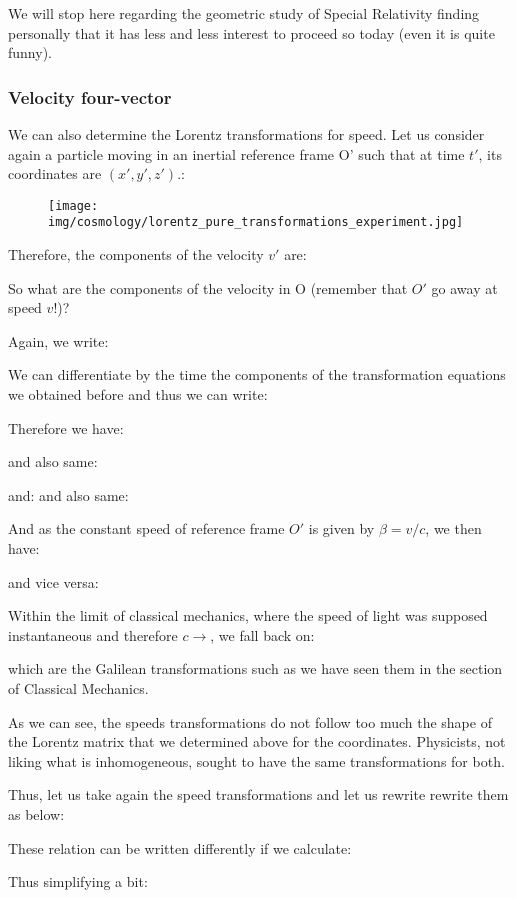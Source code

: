 	We will stop here regarding the geometric study of Special Relativity finding personally that it has less and less interest to proceed so today (even it is quite funny).
	
	\subsubsection{Velocity four-vector}
	We can also determine the Lorentz transformations for speed. Let us consider again a particle moving in an inertial reference frame O' such that at time $t'$, its coordinates are $(x ', y', z ').$:
	\begin{figure}[H]
		\begin{center}
		\texttt{[image: img/cosmology/lorentz\_pure\_transformations\_experiment.jpg]}
		\end{center}	
	\end{figure}
	Therefore, the components of the velocity $v'$ are:
	
	So what are the components of the velocity in O (remember that $O'$ go away at speed $v$!)?
	
	Again, we write:
	
	We can differentiate by the time the components of the transformation equations we obtained before and thus we can write:
	
	Therefore we have:
	
	and also same:
	
	and:
	and also same:
	
	And as the constant speed of reference frame $O'$ is given by $\beta=v/c$, we then have:
	
	and vice versa:
	
	Within the limit of classical mechanics, where the speed of light was supposed instantaneous and therefore $c\rightarrow$, we fall back on:
	
	which are the Galilean transformations such as we have seen them in the section of Classical Mechanics.

	As we can see, the speeds transformations do not follow too much the shape of the Lorentz matrix that we determined above for the coordinates. Physicists, not liking what is inhomogeneous, sought to have the same transformations for both.

	Thus, let us take again the speed transformations and let us rewrite rewrite them as below:
	
	These relation can be written differently if we calculate:
	
	Thus simplifying a bit:
	
